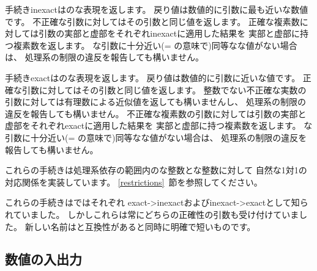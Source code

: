\begin{entry}{%
}

手続き{\cf inexact}はのな表現を返します。
戻り値は数値的に引数に最も近いな数値です。
不正確な引数に対してはその引数と同じ値を返します。
正確な複素数に対しては引数の実部と虚部をそれぞれ{\cf inexact}に適用した結果を
実部と虚部に持つ複素数を返します。
な引数に十分近い({\cf =} の意味で)同等なな値がない場合は、
処理系の制限の違反を報告しても構いません。

手続き{\cf exact}はのな表現を返します。
戻り値は数値的に引数に近いな値です。
正確な引数に対してはその引数と同じ値を返します。
整数でない不正確な実数の引数に対しては有理数による近似値を返しても構いませんし、
処理系の制限の違反を報告しても構いません。
不正確な複素数の引数に対しては引数の実部と虚部をそれぞれ{\cf exact}に適用した結果を
実部と虚部に持つ複素数を返します。
な引数に十分近い({\cf =} の意味で)同等なな値がない場合は、
処理系の制限の違反を報告しても構いません。

これらの手続きは処理系依存の範囲内のな整数とな整数に対して
自然な1対1の対応関係を実装しています。
\ref{restrictions}~節を参照してください。

\begin{note}
これらの手続きは\rfivers{}ではそれぞれ
{\cf exact->inexact}および{\cf inexact->exact}として知られていました。
しかしこれらは常にどちらの正確性の引数も受け付けていました。
新しい名前は\rsixrs{}と互換性があると同時に明確で短いものです。
\end{note}

\end{entry}

\medskip

\subsection{数値の入出力}


